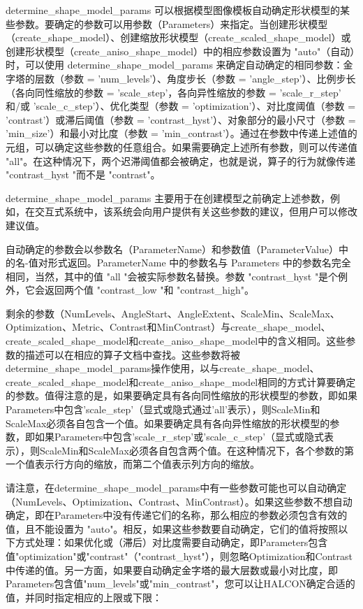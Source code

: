 \documentclass{article}
\begin{document}
determine\_shape\_model\_params 可以根据模型图像模板自动确定形状模型的某些参数。要确定的参数可以用参数（Parameters）来指定。当创建形状模型（create\_shape\_model）、创建缩放形状模型（create\_scaled\_shape\_model）或创建形状模型（create\_aniso\_shape\_model）中的相应参数设置为 "auto"（自动）时，可以使用 determine\_shape\_model\_params 来确定自动确定的相同参数：金字塔的层数（参数 = 'num\_levels'）、角度步长（参数 = 'angle\_step'）、比例步长（各向同性缩放的参数 = 'scale\_step'，各向异性缩放的参数 = 'scale\_r\_step' 和/或 'scale\_c\_step'）、优化类型（参数 = 'optimization'）、对比度阈值（参数 = 'contrast'）或滞后阈值（参数 = 'contrast\_hyst'）、对象部分的最小尺寸（参数 = 'min\_size'）和最小对比度（参数 = 'min\_contrast'）。通过在参数中传递上述值的元组，可以确定这些参数的任意组合。如果需要确定上述所有参数，则可以传递值 "all"。在这种情况下，两个迟滞阈值都会被确定，也就是说，算子的行为就像传递 "contrast\_hyst "而不是 "contrast"。

determine\_shape\_model\_params 主要用于在创建模型之前确定上述参数，例如，在交互式系统中，该系统会向用户提供有关这些参数的建议，但用户可以修改建议值。

自动确定的参数会以参数名（ParameterName）和参数值（ParameterValue）中的名-值对形式返回。ParameterName 中的参数名与 Parameters 中的参数名完全相同，当然，其中的值 "all "会被实际参数名替换。参数 "contrast\_hyst "是个例外，它会返回两个值 "contrast\_low "和 "contrast\_high"。

剩余的参数（NumLevels、AngleStart、AngleExtent、ScaleMin、ScaleMax、Optimization、Metric、Contrast和MinContrast）与create\_shape\_model、create\_scaled\_shape\_model和create\_aniso\_shape\_model中的含义相同。这些参数的描述可以在相应的算子文档中查找。这些参数将被determine\_shape\_model\_params操作使用，以与create\_shape\_model、create\_scaled\_shape\_model和create\_aniso\_shape\_model相同的方式计算要确定的参数。值得注意的是，如果要确定具有各向同性缩放的形状模型的参数，即如果Parameters中包含'scale\_step'（显式或隐式通过'all'表示），则ScaleMin和ScaleMax必须各自包含一个值。如果要确定具有各向异性缩放的形状模型的参数，即如果Parameters中包含'scale\_r\_step'或'scale\_c\_step'（显式或隐式表示），则ScaleMin和ScaleMax必须各自包含两个值。在这种情况下，各个参数的第一个值表示行方向的缩放，而第二个值表示列方向的缩放。

请注意，在determine\_shape\_model\_params中有一些参数可能也可以自动确定（NumLevels、Optimization、Contrast、MinContrast）。如果这些参数不想自动确定，即在Parameters中没有传递它们的名称，那么相应的参数必须包含有效的值，且不能设置为 "auto"。相反，如果这些参数要自动确定，它们的值将按照以下方式处理：如果优化或（滞后）对比度需要自动确定，即Parameters包含值"optimization"或"contrast"（"contrast\_hyst"），则忽略Optimization和Contrast中传递的值。另一方面，如果要自动确定金字塔的最大层数或最小对比度，即Parameters包含值"num\_levels"或"min\_contrast"，您可以让HALCON确定合适的值，并同时指定相应的上限或下限：
\end{document}
